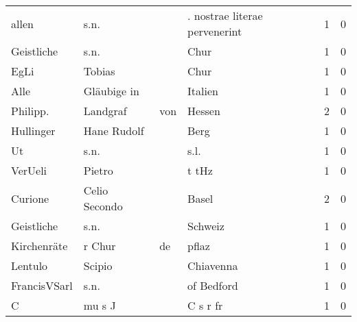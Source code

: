 \documentclass[10pt,a4paper,landscape]{article}
\begin{document}
\begin{longtable}{llllrr}
                    allen &                               s.n. &             &               . nostrae literae pervenerint &          1 &         0 \\
               Geistliche &                               s.n. &             &                                        Chur &          1 &         0 \\
                     EgLi &                             Tobias &             &                                        Chur &          1 &         0 \\
                     Alle &                        Gläubige in &             &                                     Italien &          1 &         0 \\
                 Philipp. &                           Landgraf &         von &                                      Hessen &          2 &         0 \\
                Hullinger &                        Hane Rudolf &             &                                        Berg &          1 &         0 \\
                       Ut &                               s.n. &             &                                        s.l. &          1 &         0 \\
                  VerUeli &                             Pietro &             &                                       t tHz &          1 &         0 \\
                  Curione &                      Celio Secondo &             &                                       Basel &          2 &         0 \\
               Geistliche &                               s.n. &             &                                     Schweiz &          1 &         0 \\
              Kirchenräte &                             r Chur &          de &                                       pflaz &          1 &         0 \\
                  Lentulo &                             Scipio &             &                                   Chiavenna &          1 &         0 \\
             FrancisVSarl &                               s.n. &             &                                  of Bedford &          1 &         0 \\
                        C &                             mu s J &             &                                    C s r fr &          1 &         0 \\

\end{longtable}
\end{document}
